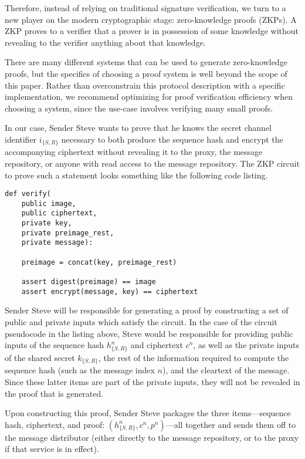 Therefore, instead of relying on traditional signature verification, we turn to a new player on the modern cryptographic stage: zero-knowledge proofs (ZKPs). A ZKP proves to a verifier that a prover is in possession of some knowledge without revealing to the verifier anything about that knowledge. \parencite{goldwasser_knowledge_1985}

There are many different systems that can be used to generate zero-knowledge proofs, but the specifics of choosing a proof system is well beyond the scope of this paper. Rather than overconstrain this protocol description with a specific implementation, we recommend optimizing for proof verification efficiency when choosing a system, since the use-case involves verifying many small proofs.

In our case, Sender Steve wants to prove that he knows the secret channel identifier $i_{\{S,R\}}$ necessary to both produce the sequence hash and encrypt the accompanying ciphertext without revealing it to the proxy, the message repository, or anyone with read access to the message repository. The ZKP circuit to prove such a statement looks something like the following code listing.

\begin{verbatim}
def verify(
    public image,
    public ciphertext,
    private key,
    private preimage_rest,
    private message):

    preimage = concat(key, preimage_rest)

    assert digest(preimage) == image
    assert encrypt(message, key) == ciphertext
\end{verbatim}

Sender Steve will be responsible for generating a proof by constructing a set of public and private inputs which satisfy the circuit. In the case of the circuit pseudocode in the listing above, Steve would be responsible for providing public inputs of the sequence hash $h_{\{S,R\}}^n$ and ciphertext $c^n$, as well as the private inputs of the shared secret $k_{\{S,R\}}$, the rest of the information required to compute the sequence hash (such as the message index $n$), and the cleartext of the message. Since these latter items are part of the private inputs, they will not be revealed in the proof that is generated.

Upon constructing this proof, Sender Steve packages the three items---sequence hash, ciphertext, and proof: $(h_{\{S,R\}}^n, c^n, p^n)$---all together and sends them off to the message distributor (either directly to the message repository, or to the proxy if that service is in effect).

